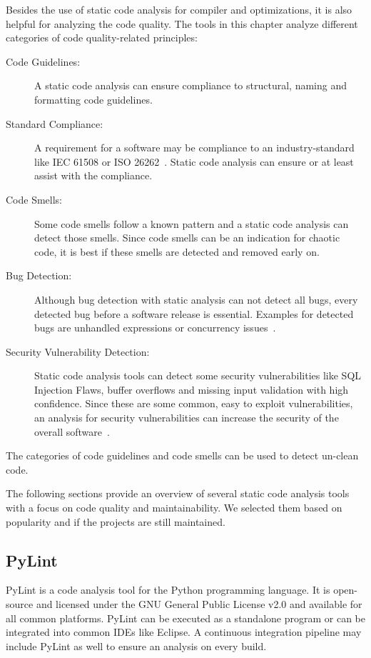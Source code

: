 Besides the use of static code analysis for compiler and optimizations, it is also helpful for analyzing the code quality. The tools in this chapter analyze different categories of code quality-related principles:
\begin{description}
    \item[Code Guidelines:] A static code analysis can ensure compliance to structural, naming and formatting code guidelines. 
    \item[Standard Compliance:] A requirement for a software may be compliance to an industry-standard like IEC 61508 or ISO 26262~\cite{tc_65sc_65a_iec_2010,isotc_22sc_32_iso_2018}. Static code analysis can ensure or at least assist with the compliance.  
    \item[Code Smells:] Some code smells follow a known pattern and a static code analysis can detect those smells. Since code smells can be an indication for chaotic code, it is best if these smells are detected and removed early on.
    \item[Bug Detection:] Although bug detection with static analysis can not detect all bugs, every detected bug before a software release is essential. Examples for detected bugs are unhandled expressions or concurrency issues~\cite{delaitre_evaluating_2015}.
    \item[Security Vulnerability Detection:] Static code analysis tools can detect some security vulnerabilities like SQL Injection Flaws, buffer overflows and missing input validation with high confidence. Since these are some common, easy to exploit vulnerabilities, an analysis for security vulnerabilities can increase the security of the overall software~\cite{wichers_source_nodate}.  
\end{description}

The categories of code guidelines and code smells can be used to detect un-clean code.

The following sections provide an overview of several static code analysis tools with a focus on code quality and maintainability. We selected them based on popularity and if the projects are still maintained.

\subsection{PyLint}
PyLint is a code analysis tool for the Python programming language. It is open-source and licensed under the GNU General Public License v2.0 and available for all common platforms. PyLint can be executed as a standalone program or can be integrated into common IDEs like Eclipse. A continuous integration pipeline may include PyLint as well to ensure an analysis on every build.

